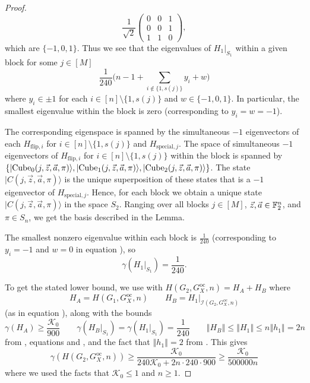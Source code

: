 \documentclass[../thesis-main/thesis-main]{subfiles}
\begin{document}
\begin{proof}
\begin{equation}
\frac{1}{\sqrt{2}}\begin{pmatrix}
0 & 0 & 1\\
0 & 0 & 1\\
1 & 1 & 0
\end{pmatrix},
\end{equation}
which are $\{-1,0,1\}$. Thus we see that the eigenvalues of $H_1|_{S_{1}}$ within a given block for some $j\in [M]$ \begin{equation}
  \frac{1}{240}\bigg(n-1+\sum_{i\notin\{1,s(j)\}}y_{i}+w\bigg)
  \label{eq:block_eig}
\end{equation}
where $y_{i}\in\pm1$ for each $i\in[n]\setminus\{1,s(j)\}$ and $w\in\{-1,0,1\}$. In particular, the smallest eigenvalue within the block is zero (corresponding to $y_i=w=-1$). 

The corresponding eigenspace is spanned by the simultaneous $-1$ eigenvectors of each $H_{\mathrm{flip},i}$ for $i\in [n]\setminus \{1,s(j)\}$ and $H_{\mathrm{special},j}$. The space of simultaneous $-1$ eigenvectors of $H_{\mathrm{flip},i}$ for $i\in [n]\setminus\{1,s(j)\}$ within the block is spanned by $\{|{\operatorname{Cube}_{0}(j,\vec{z},\vec{a},\pi)}\rangle, |{\operatorname{Cube}_{1}(j,\vec{z},\vec{a},\pi)}\rangle, |{\operatorname{Cube}_{2}(j,\vec{z},\vec{a},\pi)}\rangle\}$. The state $|C(j,\vec{z},\vec{a},\pi)\rangle$  is the unique superposition of these states that is a $-1$ eigenvector of $H_{\mathrm{special},j}$. Hence, for each block we obtain a unique state $|C(j,\vec{z},\vec{a},\pi)\rangle$ in the space $S_2$. Ranging over all blocks $j\in [M]$, $\vec{z},\vec{a}\in \mathbb{F}_2^n$, and $\pi\in S_n$, we get the basis described in the Lemma.

The smallest nonzero eigenvalue within each block is $\frac{1}{240}$ (corresponding to $y_{i}=-1$ and $w=0$ in equation ), so 
\begin{equation}
\gamma(H_{1}|_{S_{1}})=\frac{1}{240}.\label{eq:lowerbnd_H1S_alph}
\end{equation}

To get the stated lower bound, we use  with $H(G_{2},G_X^{\text{oc}},n) = H_{A}+H_{B}$ where 
\begin{equation}
H_{A}=H(G_{1},G_X^{\text{oc}},n)\qquad H_{B}=H_{1}|_{\mathcal{I}(G_{2},G_X^{\text{oc}},n)}
\end{equation}
(as in equation ), along with the bounds 
\begin{equation}
\gamma(H_{A}) \geq \frac{\mathcal{K}_0}{900}\qquad\gamma(H_{B}|_{S_{1}})=\gamma(H_{1}|_{S_{1}})=\frac{1}{240}\qquad\left\Vert H_{B}\right\Vert \leq\left\Vert H_{1}\right\Vert \leq n\left\Vert h_{1}\right\Vert =2n
\end{equation}
from , equations  and , and the fact that $\left\Vert h_{1}\right\Vert =2$ from . This gives 
\begin{equation}
  \gamma(H(G_2,G_X^{\text{oc}},n))
  \geq \frac{\mathcal{K}_0}{240\mathcal{K}_0+2n\cdot240\cdot900}
  \geq \frac{\mathcal{K}_0}{500000n}
\end{equation}
where we used the facts that $\mathcal{K}_0\leq 1$ and $n \ge 1$.
\end{proof}
\end{document}
